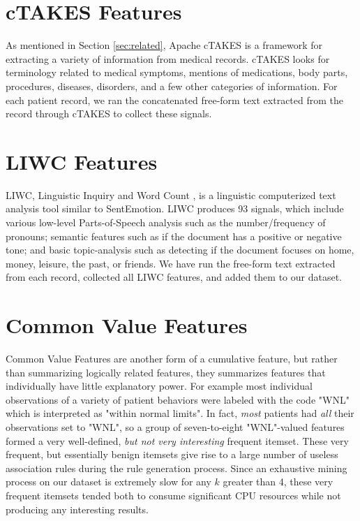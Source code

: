  \section{cTAKES Features} As mentioned in Section \ref{sec:related}, \textsf{Apache cTAKES} is a framework for extracting a variety of information from medical records.
 \textsf{cTAKES} looks for terminology related to medical symptoms, mentions
 of medications, body parts, procedures, diseases, disorders, and a few other
 categories of information.  For each patient record, we ran the concatenated free-form text
 extracted from the record through \textsf{cTAKES} to collect these signals.
 

 \section{LIWC Features}
  \textsf{LIWC}, Linguistic Inquiry and Word Count  \cite{liwc}, is a linguistic computerized text analysis tool similar to SentEmotion. 
 \textsf{LIWC} produces 93 signals, which include various low-level Parts-of-Speech analysis such as the number/frequency of pronouns; 
 semantic features such as if the document has a positive or negative tone; and basic topic-analysis such as detecting if the document focuses on home, money, leisure, the past, or friends.
 We have run the free-form text extracted from each record, collected all
 \textsf{LIWC} features, and added them to our dataset.
 

 \section{Common Value Features}
\textsf{Common Value Features} are another form of a cumulative feature, but rather than summarizing logically related features, they summarizes features that individually have little explanatory power.
For example most individual observations of a variety of patient behaviors
were labeled with the code \textsf{"WNL"} which is interpreted as \textsf{"within normal limits"}.  In fact, \textit{most} patients had \textit{all} their observations
set to \textsf{"WNL"}, so a group of seven-to-eight \textsf{"WNL"}-valued features
formed a very well-defined, \textit{but not very interesting} frequent itemset.
These very frequent, but essentially benign itemsets give rise to a large number of 
useless association rules during the rule generation process. Since an exhaustive
mining process on our dataset is extremely slow for any $k$ greater than 4, these \textsf{very frequent itemsets} tended both to consume
significant CPU resources while not producing any interesting results.

